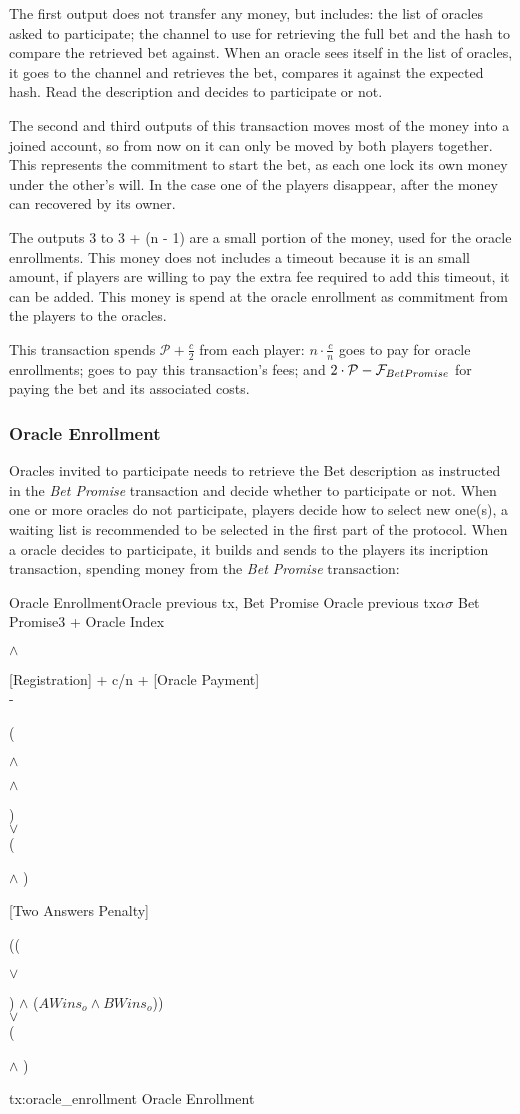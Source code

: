 The first output does not transfer any money, but includes: the list of oracles
  asked to participate; the channel to use for retrieving the full bet and the
  hash to compare the retrieved bet against.
When an oracle sees itself in the list of oracles, it goes to the channel and
  retrieves the bet, compares it against the expected hash.
Read the description and decides to participate or not.

The second and third outputs of this transaction moves most of the money into
  a joined account, so from now on it can only be moved by both players
  together.
This represents the commitment to start the bet, as each one lock its own money
  under the other's will.
In the case one of the players disappear, after  the money can
  recovered by its owner.

The outputs 3 to 3 + (n - 1) are a small portion of the money, used for the
  oracle enrollments.
This money does not includes a timeout because it is an small amount, if players
  are willing to pay the extra fee required to add this timeout, it can be
  added.
This money is spend at the oracle enrollment as commitment from the players to
  the oracles.

This transaction spends $\mathcal{P} + \frac{c}{2}$ from each player:
  $ n \cdot \frac{c}{n}$ goes to pay for oracle enrollments; 
  goes to pay this transaction's fees; and
  $2 \cdot \mathcal{P} - \mathcal{F}_{Bet Promise} $ for paying the bet and its
  associated costs.

\subsubsection{Oracle Enrollment}
Oracles invited to participate needs to retrieve the Bet description as
  instructed in the \textit{Bet Promise} transaction and decide whether to
  participate or not.
When one or more oracles do not participate, players decide how to select new
  one(s), a waiting list is recommended to be selected in the first part of the
  protocol.
When a oracle decides to participate, it builds and sends to the players its
  incription transaction, spending money from the \textit{Bet Promise}
  transaction:

\transaction%
    {Oracle Enrollment}{Oracle previous tx, Bet Promise}
    {Oracle previous tx}{$\alpha$}{$\sigma$}
    {Bet Promise}{3 + Oracle Index}{\signature{A} $\wedge$ \signature{B}}
    \stopinputs
    {[Registration] + c/n + [Oracle Payment] \\ - }
        {(\signature{Oracle} $\wedge$ \signature{A} $\wedge$ \signature{B}) \\
            $\vee$ \\
         (\signature{Oracle} $\wedge$ )}
    {[Two Answers Penalty]}{((\signature{A} $\vee$ \signature{B}) $\wedge$ %
                             ($AWins_o \wedge BWins_o$)) \\
                           $\vee$ \\
                       (\signature{Oracle} $\wedge$ )}
    \stopoutputs
    {tx:oracle_enrollment}
    {Oracle Enrollment}

